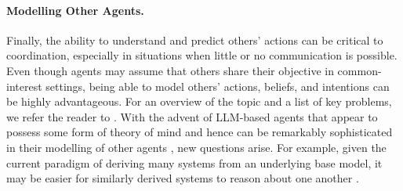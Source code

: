 \paragraph{Modelling Other Agents.}
Finally, the ability to understand and predict others' actions can be critical to coordination, especially in situations when little or no communication is possible.
Even though agents may assume that others share their objective in common-interest settings, being able to model others' actions, beliefs, and intentions can be highly advantageous.
For an overview of the topic and a list of key problems, we refer the reader to \citet{Albrecht2018}.
With the advent of LLM-based agents that appear to possess some form of theory of mind and hence can be remarkably sophisticated in their modelling of other agents \citep{cross2025hypothetical, li-etal-2023-theory}, new questions arise.
For example, given the current paradigm of deriving many systems from an underlying base model, it may be easier for similarly derived systems to reason about one another \citep{oesterheld2024similarity,Binder2024,berglund2023taken,OpenAI2023b}.


















